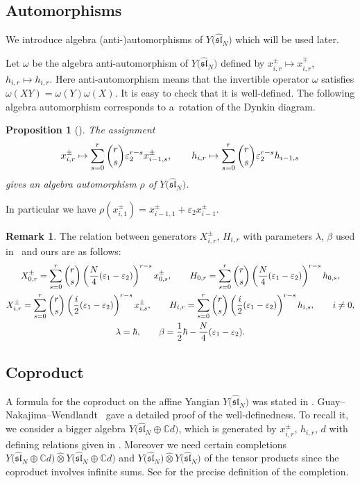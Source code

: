 \documentclass[10pt,a4paper]{amsart}
\newtheorem{prop}[thm]{Proposition}
\theoremstyle{definition}
\newtheorem{rem}[thm]{Remark}
\numberwithin{equation}{section}
\newcommand{\ve}{\varepsilon}
\newcommand{\bbC}{\mathbb{C}}
\newcommand{\affY}{Y\big(\affsl\big)}
\newcommand{\affsl}{\hat{\mathfrak{sl}}_N}
\begin{document}
\subsection{Automorphisms}

We introduce algebra (anti-)automorphisms of $\affY$ which will be used later.

Let $\omega$ be the algebra anti-automorphism of $\affY$ defined by $x_{i,r}^{\pm} \mapsto x_{i,r}^{\mp}$, $h_{i,r} \mapsto h_{i,r}$. Here anti-automorphism means that the invertible operator $\omega$ satisfies $\omega(XY)=\omega(Y)\omega(X)$. It is easy to check that it is well-defined. The following algebra automorphism corresponds to a~rotation of the Dynkin diagram.
\begin{prop}[{\cite[Lemma~3.5]{MR2199856}}] The assignment
\begin{gather*}
x_{i,r}^{\pm} \mapsto \sum_{s=0}^r \dbinom{r}{s} \ve_2^{r-s} x_{i-1,s}^{\pm}, \qquad h_{i,r} \mapsto \sum_{s=0}^r \dbinom{r}{s} \ve_2^{r-s} h_{i-1,s}
\end{gather*}
gives an algebra automorphism $\rho$ of $\affY$.
\end{prop}
In particular we have $\rho(x_{i,1}^{\pm}) = x_{i-1,1}^{\pm} + \ve_2 x_{i-1}^{\pm}$.
\begin{rem}The relation between generators $X_{i,r}^{\pm}$, $H_{i,r}$ with parameters $\lambda$, $\beta$ used in~\cite{MR2199856,MR2323534} and ours are as follows:
\begin{gather*}
X_{0,r}^{\pm} = \sum_{s=0}^r \dbinom{r}{s} \left( \dfrac{N}{4}(\ve_1-\ve_2)\right)^{r-s} x_{0,s}^{\pm},\qquad H_{0,r} = \sum_{s=0}^r \dbinom{r}{s} \left( \dfrac{N}{4}(\ve_1-\ve_2)\right)^{r-s} h_{0,s},\\
X_{i,r}^{\pm} = \sum_{s=0}^r \dbinom{r}{s} \left( \dfrac{i}{2}(\ve_1-\ve_2)\right)^{r-s} x_{i,s}^{\pm}, \qquad H_{i,r} = \sum_{s=0}^r \dbinom{r}{s} \left( \dfrac{i}{2}(\ve_1-\ve_2)\right)^{r-s} h_{i,s}, \qquad i \neq 0,\\
\lambda = \hbar, \qquad \beta = \frac{1}{2} \hbar - \dfrac{N}{4}(\ve_1-\ve_2).
\end{gather*}
\end{rem}

\subsection{Coproduct}

A formula for the coproduct on the affine Yangian $\affY$ was stated in \cite{MR2323534}. Guay--Nakajima--Wendlandt~\cite{MR3861718} gave a detailed proof of the well-definedness. To recall it, we consider a bigger algebra $Y\big(\affsl \oplus \bbC d\big)$, which is generated by $x_{i,r}^{\pm}$, $h_{i,r}$, $d$ with defining relations given in \cite[equation~(2.8)]{MR3861718}. Moreover we need certain completions $Y\big(\affsl \oplus \bbC d\big) \widehat{\otimes} Y\big(\affsl \oplus \bbC d\big)$ and $\affY \widehat{\otimes} \affY$ of the tensor products since the coproduct involves infinite sums. See \cite[Section~5]{MR3861718} for the precise definition of the completion.
\end{document}
